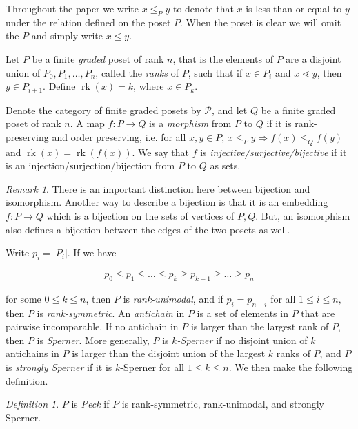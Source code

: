 \documentclass[10 pt]{amsart}
\theoremstyle{plain}
\theoremstyle{definition}
\theoremstyle{remark}
\numberwithin{equation}{section}
\theoremstyle{remark}
\newtheorem{rem}[thm]{Remark}
\newtheorem{defn}[thm]{Definition}
\newcommand\rk{\operatorname{rk}}
\begin{document}
Throughout the paper we write $x\le_P y$ to denote that $x$ is less than or equal to $y$ under the relation defined on the poset $P$. When the poset is clear we will omit the $P$ and simply write $x\le y$.

Let $P$ be a finite {\it graded} poset of rank $n$, that is the elements of $P$ are a disjoint union of $P_0,P_1,\ldots,P_n$, called the \textit{ranks} of $P$, such that if $x\in P_i$ and $x\lessdot y$, then $y\in P_{i+1}$.  Define $\rk(x) = k$, where $x\in P_k$.

Denote the category of finite graded posets by $\mathcal{P}$, and let $Q$ be a finite graded poset of rank $n$.  A map $f\colon P\rightarrow Q$ is a \textit{morphism} from $P$ to $Q$ if it is rank-preserving and order preserving, i.e. for all $x,y\in P$, $x\le_P y \Rightarrow f(x)\le_Q f(y)$ and $\rk(x) = \rk(f(x))$.  We say that $f$ is \textit{injective/surjective/bijective} if it is an injection/surjection/bijection from $P$ to $Q$ as sets.

\begin{rem}
There is an important distinction here between bijection and isomorphism. Another way to describe a bijection is that it is an embedding $f:P\rightarrow Q$ which is a bijection on the sets of vertices of $P,Q$. But, an isomorphism also defines a bijection between the edges of the two posets as well.
\end{rem}

Write $p_i = |P_i|$.  If we have

$$p_0\le p_1\le \ldots \le p_k \ge p_{k+1} \ge\ldots \ge p_n$$

\noindent for some $0\le k\le n$, then $P$ is \textit{rank-unimodal}, and if $p_i = p_{n-i}$ for all $1\le i\le n,$ then $P$ is \textit{rank-symmetric}.  An \textit{antichain} in $P$ is a set of elements in $P$ that are pairwise incomparable.  If no antichain in $P$ is larger than the largest rank of $P$, then $P$ is \textit{Sperner}.  More generally, $P$ is \textit{$k$-Sperner} if no disjoint union  of $k$ antichains in $P$ is larger than the disjoint union of the largest $k$ ranks of $P$, and $P$ is \textit{strongly Sperner} if it is $k$-Sperner for all $1\le k\le n$.  We then make the following definition.

\begin{defn}
$P$ is \textit{Peck} if $P$ is rank-symmetric, rank-unimodal, and strongly Sperner.
\end{defn}
\end{document}
